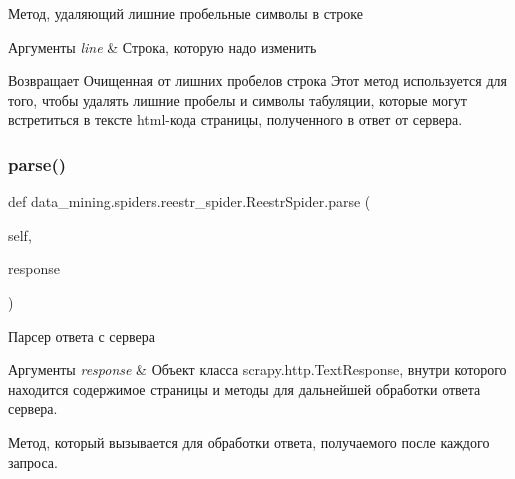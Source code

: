 Метод, удаляющий лишние пробельные символы в строке 


\begin{DoxyParams}{Аргументы}
{\em line} & Строка, которую надо изменить \\
\hline
\end{DoxyParams}
\begin{DoxyReturn}{Возвращает}
Очищенная от лишних пробелов строка Этот метод используется для того, чтобы удалять лишние пробелы и символы табуляции, которые могут встретиться в тексте html-\/кода страницы, полученного в ответ от сервера. 
\end{DoxyReturn}
\mbox{\label{classdata__mining_1_1spiders_1_1reestr__spider_1_1ReestrSpider_a9b11b00b7a706fe10bc7b6cb4c4f38e5}} 
\subsubsection{\texorpdfstring{parse()}{parse()}}
{\footnotesize\ttfamily def data\+\_\+mining.\+spiders.\+reestr\+\_\+spider.\+Reestr\+Spider.\+parse (\begin{DoxyParamCaption}\item[{}]{self,  }\item[{}]{response }\end{DoxyParamCaption})}



Парсер ответа с сервера 


\begin{DoxyParams}{Аргументы}
{\em response} & Объект класса scrapy.\+http.\+Text\+Response, внутри которого находится содержимое страницы и методы для дальнейшей обработки ответа сервера.\\
\hline
\end{DoxyParams}
Метод, который вызывается для обработки ответа, получаемого после каждого запроса. \mbox{\label{classdata__mining_1_1spiders_1_1reestr__spider_1_1ReestrSpider_a5c4b518f8df543751ea7f9ecef4e7196}} 
